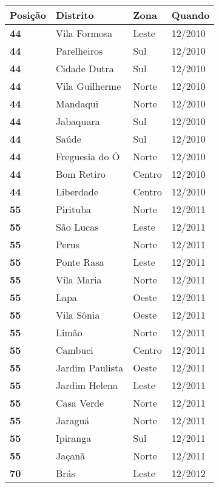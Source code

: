 \begin{table}[H]
	\centering
	\begin{tabular}{l|l|l|l}
		\textbf{Posição} & \textbf{Distrito} & \textbf{Zona} & \textbf{Quando} \\ \hline
		\textbf{44} & Vila Formosa & Leste & 12/2010\\ \hline
		\textbf{44} & Parelheiros & Sul & 12/2010\\ \hline
		\textbf{44} & Cidade Dutra & Sul & 12/2010\\ \hline
		\textbf{44} & Vila Guilherme & Norte & 12/2010\\ \hline
		\textbf{44} & Mandaqui & Norte & 12/2010\\ \hline
		\textbf{44} & Jabaquara & Sul & 12/2010\\ \hline
		\textbf{44} & Saúde & Sul & 12/2010\\ \hline
		\textbf{44} & Freguesia do Ó & Norte & 12/2010\\ \hline
		\textbf{44} & Bom Retiro & Centro & 12/2010\\ \hline
		\textbf{44} & Liberdade & Centro & 12/2010\\ \hline
		\textbf{55} & Pirituba & Norte & 12/2011\\ \hline
		\textbf{55} & São Lucas & Leste & 12/2011\\ \hline
		\textbf{55} & Perus & Norte & 12/2011\\ \hline
		\textbf{55} & Ponte Rasa & Leste & 12/2011\\ \hline
		\textbf{55} & Vila Maria & Norte & 12/2011\\ \hline
		\textbf{55} & Lapa & Oeste & 12/2011\\ \hline
		\textbf{55} & Vila Sônia & Oeste & 12/2011\\ \hline
		\textbf{55} & Limão & Norte & 12/2011\\ \hline
		\textbf{55} & Cambuci & Centro & 12/2011\\ \hline
		\textbf{55} & Jardim Paulista & Oeste & 12/2011\\ \hline
		\textbf{55} & Jardim Helena & Leste & 12/2011\\ \hline
		\textbf{55} & Casa Verde & Norte & 12/2011\\ \hline
		\textbf{55} & Jaraguá & Norte & 12/2011\\ \hline
		\textbf{55} & Ipiranga & Sul & 12/2011\\ \hline
		\textbf{55} & Jaçanã & Norte & 12/2011\\ \hline
		\textbf{70} & Brás & Leste & 12/2012\\ \hline

\end{tabular}
\end{table}
